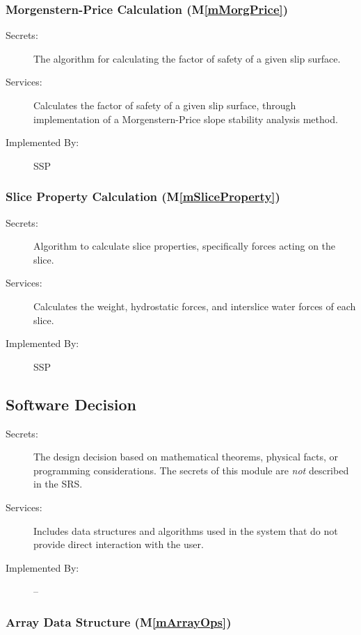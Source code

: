 \documentclass[12pt, titlepage]{article}
\newcommand{\progname}{SSP}
\newcommand{\mref}[1]{M\ref{#1}}
\begin{document}
\subsubsection{Morgenstern-Price Calculation (\mref{mMorgPrice})}

\begin{description}
\item[Secrets:] The algorithm for calculating the factor of safety of a given 
slip surface.
\item[Services:] Calculates the factor of safety of a given slip
  surface, through implementation of a Morgenstern-Price slope
  stability analysis method.
\item[Implemented By:] \progname
\end{description} 

\subsubsection{Slice Property Calculation (\mref{mSliceProperty})}
\begin{description}
\item[Secrets:] Algorithm to calculate slice properties, specifically forces 
acting on the slice. 
\item[Services:] Calculates the weight, hydrostatic forces, and interslice 
water forces of each slice.
\item[Implemented By:] \progname
\end{description} 


\subsection{Software Decision}

\begin{description}
\item[Secrets:] The design decision based on mathematical theorems,
  physical facts, or programming considerations. The secrets of this
  module are \emph{not} described in the SRS.
\item[Services:] Includes data structures and algorithms used in the
  system that do not provide direct interaction with the user.
\item[Implemented By:] --
\end{description}


\subsubsection{Array Data Structure (\mref{mArrayOps})}
\end{document}
